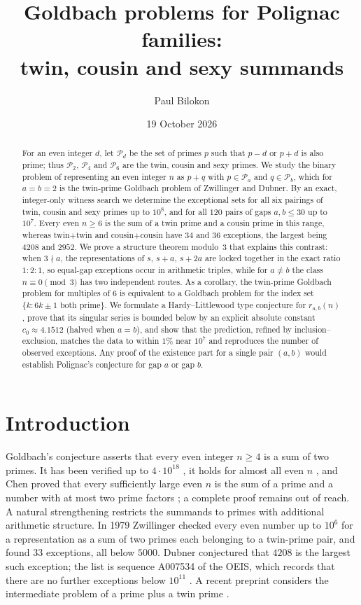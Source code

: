 \documentclass[11pt]{amsart}
\title[Goldbach problems for Polignac families]{Goldbach problems for Polignac families:\\ twin, cousin and sexy summands}
\author{Paul Bilokon}
\date{19 October 2026}
\theoremstyle{definition}
\theoremstyle{remark}
\newcommand{\PP}{\mathcal{P}}
\begin{document}
\begin{abstract}
For an even integer $d$, let $\PP_d$ be the set of primes $p$ such that $p-d$ or $p+d$ is also prime; thus $\PP_2$, $\PP_4$ and $\PP_6$ are the twin, cousin and sexy primes. We study the binary problem of representing an even integer $n$ as $p+q$ with $p\in\PP_a$ and $q\in\PP_b$, which for $a=b=2$ is the twin-prime Goldbach problem of Zwillinger and Dubner. By an exact, integer-only witness search we determine the exceptional sets for all six pairings of twin, cousin and sexy primes up to $10^8$, and for all $120$ pairs of gaps $a,b\le 30$ up to $10^7$. Every even $n\ge 6$ is the sum of a twin prime and a cousin prime in this range, whereas twin$+$twin and cousin$+$cousin have $34$ and $36$ exceptions, the largest being $4208$ and $2952$. We prove a structure theorem modulo~$3$ that explains this contrast: when $3\nmid a$, the representations of $s$, $s+a$, $s+2a$ are locked together in the exact ratio $1:2:1$, so equal-gap exceptions occur in arithmetic triples, while for $a\ne b$ the class $n\equiv 0\pmod 3$ has two independent routes. As a corollary, the twin-prime Goldbach problem for multiples of $6$ is equivalent to a Goldbach problem for the index set $\{k:6k\pm1\text{ both prime}\}$. We formulate a Hardy--Littlewood type conjecture for $r_{a,b}(n)$, prove that its singular series is bounded below by an explicit absolute constant $c_0\approx 4.1512$ (halved when $a=b$), and show that the prediction, refined by inclusion--exclusion, matches the data to within $1\%$ near $10^7$ and reproduces the number of observed exceptions. Any proof of the existence part for a single pair $(a,b)$ would establish Polignac's conjecture for gap $a$ or gap $b$.
\end{abstract}

\maketitle

\section{Introduction}

Goldbach's conjecture asserts that every even integer $n\ge 4$ is a sum of two primes. It has been verified up to $4\cdot 10^{18}$ \cite{OliveiraESilva2014}, it holds for almost all even $n$ \cite{MontgomeryVaughan1975}, and Chen proved that every sufficiently large even $n$ is the sum of a prime and a number with at most two prime factors \cite{Chen1973}; a complete proof remains out of reach. A natural strengthening restricts the summands to primes with additional arithmetic structure. In 1979 Zwillinger \cite{Zwillinger1979} checked every even number up to $10^6$ for a representation as a sum of two primes each belonging to a twin-prime pair, and found $33$ exceptions, all below $5000$. Dubner \cite{Dubner2000} conjectured that $4208$ is the largest such exception; the list is sequence A007534 of the OEIS, which records that there are no further exceptions below $10^{11}$ \cite{OEIS_A007534}. A recent preprint considers the intermediate problem of a prime plus a twin prime \cite{Pandey2026}.
\end{document}
